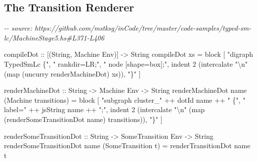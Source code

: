 \documentclass[]{article}
\newenvironment{Shaded}{}{}
\newcommand{\CommentTok}[1]{\textcolor[rgb]{0.38,0.63,0.69}{\textit{#1}}}
\newcommand{\DataTypeTok}[1]{\textcolor[rgb]{0.56,0.13,0.00}{#1}}
\newcommand{\DecValTok}[1]{\textcolor[rgb]{0.25,0.63,0.44}{#1}}
\newcommand{\FunctionTok}[1]{\textcolor[rgb]{0.02,0.16,0.49}{#1}}
\newcommand{\NormalTok}[1]{#1}
\newcommand{\OperatorTok}[1]{\textcolor[rgb]{0.40,0.40,0.40}{#1}}
\newcommand{\OtherTok}[1]{\textcolor[rgb]{0.00,0.44,0.13}{#1}}
\newcommand{\StringTok}[1]{\textcolor[rgb]{0.25,0.44,0.63}{#1}}
\begin{document}
\subsection{The Transition Renderer}\label{the-transition-renderer}

\begin{Shaded}
\begin{Highlighting}[]
\CommentTok{{-}{-} source: https://github.com/mstksg/inCode/tree/master/code{-}samples/typed{-}sm{-}lc/MachineStage5.hs\#L371{-}L406}

\OtherTok{compileDot ::}\NormalTok{ [(}\DataTypeTok{String}\NormalTok{, }\DataTypeTok{Machine} \DataTypeTok{Env}\NormalTok{)] }\OtherTok{{-}\textgreater{}} \DataTypeTok{String}
\NormalTok{compileDot xs }\OtherTok{=}
\NormalTok{  block}
\NormalTok{    [ }\StringTok{"digraph TypedSmLc \{"}\NormalTok{,}
      \StringTok{"  rankdir=LR;"}\NormalTok{,}
      \StringTok{"  node [shape=box];"}\NormalTok{,}
\NormalTok{      indent }\DecValTok{2}\NormalTok{ (intercalate }\StringTok{"\textbackslash{}n"}\NormalTok{ (}\FunctionTok{map}\NormalTok{ (}\FunctionTok{uncurry}\NormalTok{ renderMachineDot) xs)),}
      \StringTok{"\}"}
\NormalTok{    ]}

\OtherTok{renderMachineDot ::} \DataTypeTok{String} \OtherTok{{-}\textgreater{}} \DataTypeTok{Machine} \DataTypeTok{Env} \OtherTok{{-}\textgreater{}} \DataTypeTok{String}
\NormalTok{renderMachineDot name (}\DataTypeTok{Machine}\NormalTok{ transitions) }\OtherTok{=}
\NormalTok{  block}
\NormalTok{    [ }\StringTok{"subgraph cluster\_"} \OperatorTok{++}\NormalTok{ dotId name }\OperatorTok{++} \StringTok{" \{"}\NormalTok{,}
      \StringTok{"  label="} \OperatorTok{++}\NormalTok{ jsString name }\OperatorTok{++} \StringTok{";"}\NormalTok{,}
\NormalTok{      indent }\DecValTok{2}\NormalTok{ (intercalate }\StringTok{"\textbackslash{}n"}\NormalTok{ (}\FunctionTok{map}\NormalTok{ (renderSomeTransitionDot name) transitions)),}
      \StringTok{"\}"}
\NormalTok{    ]}

\OtherTok{renderSomeTransitionDot ::} \DataTypeTok{String} \OtherTok{{-}\textgreater{}} \DataTypeTok{SomeTransition} \DataTypeTok{Env} \OtherTok{{-}\textgreater{}} \DataTypeTok{String}
\NormalTok{renderSomeTransitionDot name (}\DataTypeTok{SomeTransition}\NormalTok{ t) }\OtherTok{=}\NormalTok{ renderTransitionDot name t}


\end{Highlighting}
\end{Shaded}
\end{document}
